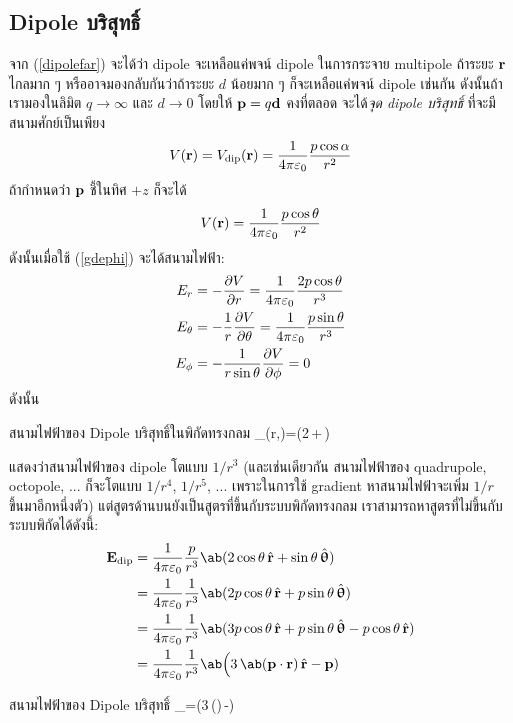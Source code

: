 \subsection{Dipole บริสุทธิ์}
จาก (\ref{dipolefar}) จะได้ว่า dipole จะเหลือแค่พจน์ dipole ในการกระจาย multipole ถ้าระยะ $\mathbf{r}$ ไกลมาก ๆ หรืออาจมองกลับกันว่าถ้าระยะ $d$ น้อยมาก ๆ ก็จะเหลือแค่พจน์ dipole เช่นกัน ดังนั้นถ้าเรามองในลิมิต $q\to\infty$ และ $d\to0$ โดยให้ $\mathbf{p}=q\mathbf{d}$ คงที่ตลอด จะได้\emph{จุด dipole บริสุทธิ์} ที่จะมีสนามศักย์เป็นเพียง
\begin{equation}
    V(\mathbf{r})=V_{\mathrm{dip}}(\mathbf{r})=\frac{1}{4\pi\varepsilon_0}\frac{p\cos\alpha}{r^2}
\end{equation}
ถ้ากำหนดว่า $\mathbf{p}$ ชี้ในทิศ $+z$ ก็จะได้
\[V(\mathbf{r})=\frac{1}{4\pi\varepsilon_0}\frac{p\cos\theta}{r^2}\]
ดังนั้นเมื่อใช้ (\ref{gdephi}) จะได้สนามไฟฟ้า:
\begin{align*}
    E_r&=-\pdv{V}{r}=\frac{1}{4\pi\varepsilon_0}\frac{2p\cos\theta}{r^3}\\
    E_\theta&=-\frac{1}{r}\pdv{V}{\theta}=\frac{1}{4\pi\varepsilon_0}\frac{p\sin\theta}{r^3}\\
    E_\phi&=-\frac{1}{r\sin\theta}\pdv{V}{\phi}=0
\end{align*}
ดังนั้น
\begin{eqbox}{สนามไฟฟ้าของ Dipole บริสุทธิ์ในพิกัดทรงกลม}
    _(r,\theta)=\kem{}\ab(2\cos\theta\,+\sin\theta\,\vus{\uptheta})
\end{eqbox}
แสดงว่าสนามไฟฟ้าของ dipole โตแบบ $1/r^3$ (และเช่นเดียวกัน สนามไฟฟ้าของ quadrupole, octopole, ... ก็จะโตแบบ $1/r^4$, $1/r^5$, ... เพราะในการใช้ gradient หาสนามไฟฟ้าจะเพิ่ม $1/r$ ขึ้นมาอีกหนึ่งตัว) แต่สูตรด้านบนยังเป็นสูตรที่ขึ้นกับระบบพิกัดทรงกลม เราสามารถหาสูตรที่ไม่ขึ้นกับระบบพิกัดได้ดังนี้:
\begin{align*}
    \vb{E}_\txt{dip}&=\kem\frac{p}{r^3}\ab(2\cos\theta\,\vu{r}+\sin\theta\,\vus{\uptheta})\\
    &=\kem\frac{1}{r^3}\ab(2p\cos\theta\,\vu{r}+p\sin\theta\,\vus{\uptheta})\\
    &=\kem\frac{1}{r^3}\ab(3p\cos\theta\,\vu{r}+p\sin\theta\,\vus{\uptheta}-p\cos\theta\,\vu{r})\\
    &=\kem\frac{1}{r^3}\ab\Big(3\,\ab(\vb{p}\cdot\vb{r})\,\vu{r}-\vb{p})
\end{align*}
\begin{eqbox}{สนามไฟฟ้าของ Dipole บริสุทธิ์}
    _=\kem{}\ab\Big(3\,\ab(\cdot{})\,-)
\end{eqbox}